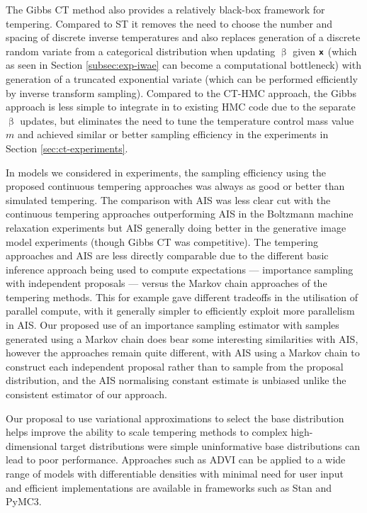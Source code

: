The Gibbs \ac{CT} method also provides a relatively black-box framework for tempering. Compared to \ac{ST} it removes the need to choose the number and spacing of discrete inverse temperatures and also replaces generation of a discrete random variate from a categorical distribution when updating $\upbeta$ given $\boldsymbol{\mathsf{x}}$ (which as seen in Section \ref{subsec:exp-iwae} can become a computational bottleneck) with generation of a truncated exponential variate (which can be performed efficiently by inverse transform sampling). Compared to the \ac{CT-HMC} approach, the Gibbs approach is less simple to integrate in to existing \ac{HMC} code due to the separate $\upbeta$ updates, but eliminates the need to tune the temperature control mass value $m$ and achieved similar or better sampling efficiency in the experiments in Section \ref{sec:ct-experiments}.

In models we considered in experiments, the sampling efficiency using the proposed continuous tempering approaches was always as good or better than simulated tempering. The comparison with \ac{AIS} was less clear cut with the continuous tempering approaches outperforming \ac{AIS} in the Boltzmann machine relaxation experiments but \ac{AIS} generally doing better in the generative image model experiments (though Gibbs \ac{CT} was competitive). The tempering approaches and \ac{AIS} are less directly comparable due to the different basic inference approach being used to compute expectations --- importance sampling with independent proposals --- versus the Markov chain approaches of the tempering methods. This for example gave different tradeoffs in the utilisation of parallel compute, with it generally simpler to efficiently exploit more parallelism in \ac{AIS}. Our proposed use of an importance sampling estimator with samples generated using a Markov chain does bear some interesting similarities with \ac{AIS}, however the approaches remain quite different, with \ac{AIS} using a Markov chain to construct each independent proposal rather than to sample from the proposal distribution, and the \ac{AIS} normalising constant estimate is unbiased unlike the consistent estimator of our approach.

Our proposal to use variational approximations to select the base distribution helps improve the ability to scale tempering methods to complex high-dimensional target distributions were simple uninformative base distributions can lead to poor performance. Approaches such as \ac{ADVI} \citep{kucukelbir2016automatic} can be applied to a wide range of models with differentiable densities with minimal need for user input and efficient implementations are available in frameworks such as Stan and PyMC3. 

